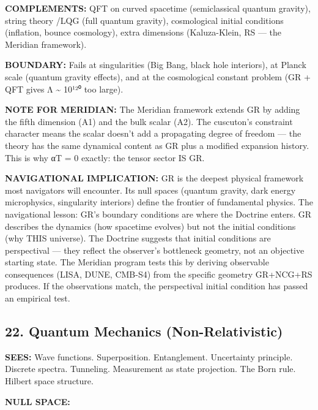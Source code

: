\textbf{COMPLEMENTS:} QFT on curved spacetime (semiclassical quantum gravity), string theory /\allowbreak  LQG (full quantum gravity), cosmological initial conditions (inflation, bounce cosmology), extra dimensions (Kaluza-Klein, RS — the Meridian framework).


\textbf{BOUNDARY:} Fails at singularities (Big Bang, black hole interiors), at Planck scale (quantum gravity effects), and at the cosmological constant problem (GR + QFT gives Λ \textasciitilde{} 10¹²⁰ too large).


\textbf{NOTE FOR MERIDIAN:} The Meridian framework extends GR by adding the fifth dimension (A1) and the bulk scalar (A2). The cuscuton's constraint character means the scalar doesn't add a propagating degree of freedom — the theory has the same dynamical content as GR plus a modified expansion history. This is why αT = 0 exactly: the tensor sector IS GR.


\textbf{NAVIGATIONAL IMPLICATION:} GR is the deepest physical framework most navigators will encounter. Its null spaces (quantum gravity, dark energy microphysics, singularity interiors) define the frontier of fundamental physics. The navigational lesson: GR's boundary conditions are where the Doctrine enters. GR describes the dynamics (how spacetime evolves) but not the initial conditions (why THIS universe). The Doctrine suggests that initial conditions are perspectival — they reflect the observer's bottleneck geometry, not an objective starting state. The Meridian program tests this by deriving observable consequences (LISA, DUNE, CMB-S4) from the specific geometry GR+NCG+RS produces. If the observations match, the perspectival initial condition has passed an empirical test.


\bigskip\noindent\makebox[\textwidth]{\color{rulegray}\rule{5cm}{0.3pt}}\bigskip


\subsection*{22. Quantum Mechanics (Non-Relativistic)}


\textbf{SEES:} Wave functions. Superposition. Entanglement. Uncertainty principle. Discrete spectra. Tunneling. Measurement as state projection. The Born rule. Hilbert space structure.


\textbf{NULL SPACE:}


